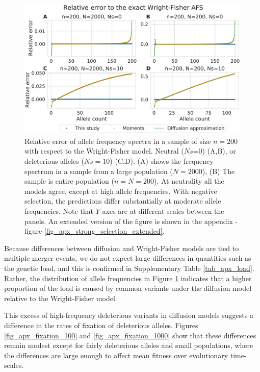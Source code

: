 \documentclass[9pt,twocolumn,twoside,lineno]{gsajnl}
\begin{document}
\begin{figure}
  \centering
  \includegraphics[width=\columnwidth]{fig/afs_comp_small.pdf}

  \caption{Relative error of allele frequency spectra in a sample of size $n=200$ with respect to
    the Wright-Fisher model. Neutral ($Ns$=0) (A,B), or deleterious alleles ($Ns=10$) (C,D). (A) shows
    the frequency spectrum in a sample from a large population ($N=2000$), (B) The sample is entire
    population ($n=N=200$). At neutrality all the models agree, except at high allele frequencies.
    With negative selection, the predictions differ substantially at moderate allele frequencies.
    Note that $Y$-axes are at different scales between the panels. An extended version of the figure
    is shown in the appendix - figure \ref{fig_apx_strong_selection_extended}.}

  \label{fig_strong_selection}
\end{figure}

Because differences between diffusion and Wright-Fisher models are tied to multiple merger events, 
we do not expect large differences in quantities such as the genetic load, and this is confirmed
in Supplementary Table \ref{tab_apx_load}. 
Rather, the distribution of allele frequencies in Figure \ref{fig_strong_selection}
 indicates that a higher proportion of the load is caused by common variants  
 under the diffusion model relative to the Wright-Fisher model. 

This excess of high-frequency deleterious variants in diffusion models suggests a difference 
in the rates of fixation of deleterious alleles. 
Figures \ref{fig_apx_fixation_100} and \ref{fig_apx_fixation_1000} show that these differences 
remain modest except for fairly deleterious alleles and small populations,
where the differences are large enough to affect mean fitness over evolutionary time-scales. 
\end{document}
